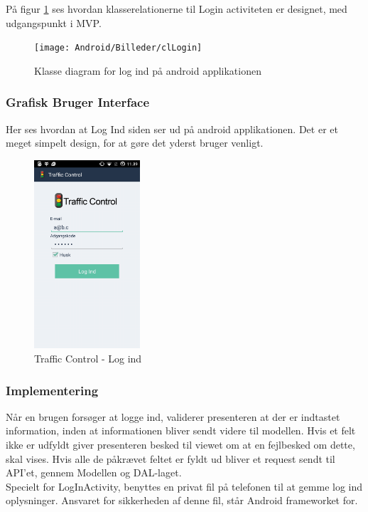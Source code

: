	På figur \ref{fig:Klasse diagram for Log Ind Android} ses hvordan klasserelationerne til Login activiteten er designet, med udgangspunkt i MVP.
	
	\begin{figure} [!ht]
		\begin{center}
			\texttt{[image: Android/Billeder/clLogin]}
		\end{center}
		\caption{Klasse diagram for log ind på android applikationen}
		\label{fig:Klasse diagram for Log Ind Android}
	\end{figure}
	\pagebreak
	
	\subsubsection{Grafisk Bruger Interface}
	Her ses hvordan at Log Ind siden ser ud på android applikationen.
	Det er et meget simpelt design, for at gøre det yderst bruger venligt.
	
	\begin{figure} [h]
		\begin{center}
			\includegraphics[height=7cm]{Android/Billeder/AndroidLogIn}
		\end{center}
		\caption{Traffic Control - Log ind}
		\label{fig:Traffic Control - Log ind}
	\end{figure}
	
	\subsubsection{Implementering}
	Når en brugen forsøger at logge ind, validerer presenteren at der er indtastet information, inden at informationen bliver sendt videre til modellen. Hvis et felt ikke er udfyldt giver presenteren besked til viewet om at en fejlbesked om dette, skal vises. Hvis alle de påkrævet feltet er fyldt ud bliver et request sendt til API'et, gennem Modellen og DAL-laget. 
	\\Specielt for LogInActivity, benyttes en privat fil på telefonen til at gemme log ind oplysninger. Ansvaret for sikkerheden af denne fil, står Android frameworket for.
	
	\pagebreak